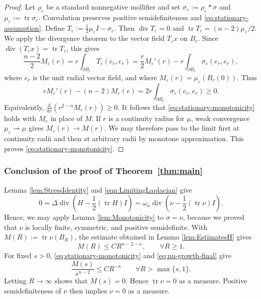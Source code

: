 \documentclass[12pt,a4paper,reqno]{amsart}
\renewcommand{\leq}{\leqslant}
\renewcommand{\geq}{\geqslant}
\renewcommand{\epsilon}{\varepsilon}
\newcommand{\tr}{\operatorname{tr}}
\begin{document}
\begin{proof}
Let $\rho_\varepsilon$ be a standard nonnegative mollifier and set
$\sigma_\varepsilon:=\rho_\varepsilon*\sigma$ and
$\mu_\varepsilon:=\operatorname{tr}\sigma_\varepsilon$.
Convolution preserves positive semidefiniteness and
\eqref{eq:stationary-assumption}. Define
$
 T_\varepsilon:=\frac12\mu_\varepsilon I-
       \sigma_\varepsilon$.
Then $\operatorname{div}T_\varepsilon=0$ and
$\operatorname{tr}T_\varepsilon=(n-2)\mu_\varepsilon/2$. We apply the divergence
theorem to the vector field $T_\varepsilon x$ on $B_r$. Since $\operatorname{div} (T_\epsilon x) = \tr T_\epsilon$, this gives
\[
 \frac{n-2}{2}M_\varepsilon(r)
 =r\int_{\partial B_r}T_\varepsilon(e_r,e_r)
 =\frac r2M_\varepsilon'(r)
   -r\int_{\partial B_r}
       \sigma_\varepsilon(e_r,e_r),
\]
where $e_r$ is the unit radial vector field, and where $M_\varepsilon(r)=\mu_\epsilon(B_r(0))$. Thus
\begin{equation}
 rM_\varepsilon'(r)-(n-2)M_\varepsilon(r)
 =2r\int_{\partial B_r}
       \sigma_\varepsilon(e_r,e_r)\geq0.
 \label{eq:stationary-derivative}
\end{equation}
Equivalently, $
 \frac{\mathrm{d}}{\mathrm{d}r}\left(r^{2-n}M_\varepsilon(r)\right)\geq0$. 
It follows that \eqref{eq:stationary-monotonicity} holds with
$M_\varepsilon$ in place of $M$.
If $r$ is a continuity radius for $\mu$, weak convergence
$\mu_\varepsilon\rightharpoonup\mu$ gives
$M_\varepsilon(r)\to M(r)$. We may therefore pass to the limit first at
continuity radii and then at arbitrary radii by monotone approximation.
This proves \eqref{eq:stationary-monotonicity}. \end{proof}

\subsubsection{Conclusion of the proof of Theorem~\ref{thm:main}}
\label{sec:stationary-vanishing} 
 Lemma
\ref{lem:StressIdentity} and \eqref{eqn:LimitingLaplacian} give
\[
 0=\Delta\operatorname{div}\left(H-\frac12(\tr H)I\right)
  =\omega_n\operatorname{div}\left(\nu-\frac12(\tr\nu)I\right).
\]
Hence, we may apply Lemma
\ref{lem:Monotonicity} to $\sigma=\nu$, because we proved that $\nu$ is locally finite, symmetric, and positive semidefinite. With
$M(R):=\operatorname{tr}\nu(B_R)$, the estimate obtained in Lemma \ref{lem:EstimatesH} gives
\begin{equation}
 M(R)\leq C R^{n-2-\kappa},\qquad \forall R\geq1.
 \label{eq:nu-growth-final}
\end{equation}
For fixed $s>0$, \eqref{eq:stationary-monotonicity} and
\eqref{eq:nu-growth-final} give
\[
 \frac{M(s)}{s^{n-2}}\leq C R^{-\kappa}
 \qquad \forall R>\max\{s,1\}.
\]
Letting $R\to\infty$ shows that $M(s)=0$. Hence $\operatorname{tr}\nu=0$ as a measure.
Positive semidefiniteness of $\nu$ then implies $\nu=0$ as a measure.
\end{document}
